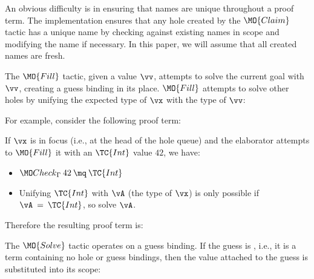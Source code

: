 An obvious difficulty is in ensuring that names are unique throughout a proof term.
The implementation ensures that any hole created by the $\MO{Claim}$ tactic
has a unique name by checking against existing names in scope and modifying
the name if necessary. In this paper, we will assume that all created names are fresh.

The $\MO{Fill}$ tactic, given a value $\vv$, attempts to solve the current goal
with $\vv$, creating a guess binding in its place. $\MO{Fill}$ attempts to
solve other holes by unifying the expected type of $\vx$ with the type of $\vv$:


\noindent
For example, consider the following proof term:

\DM{
\AR{
\hole{\vA}{\Type}\SC\hole{\vk}{\Nat}\SC
\hole{\vx}{\vA}\SC\hole{\vxs}{\Vect\:\vA\:\vk}\SC
\\
\hole{\vys}{\Vect\:\vA\:(\suc\:\vk)}\SC\vys
}
}

\noindent
If $\vx$ is in focus (i.e., at the head of the hole queue) and the elaborator
attempts to
$\MO{Fill}$ it with an $\TC{Int}$ value $42$, we have:

\begin{itemize}
\item $\Check\:42\:\mq\:\TC{Int}$
\item Unifying $\TC{Int}$ with $\vA$ (the type of $\vx$) is only possible if
$\vA\:=\:\TC{Int}$, so solve $\vA$.
\end{itemize}

\noindent
Therefore the resulting proof term is:


The $\MO{Solve}$ tactic operates on a guess binding. If the guess is , i.e., it
is a \TT{} term containing no hole or guess bindings, then the value attached to
the guess is substituted into its scope:


